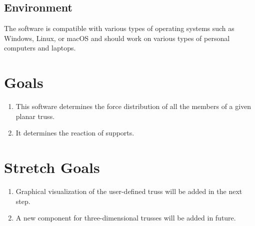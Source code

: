 \documentclass{article}
\begin{document}
\subsection{Environment}
The software is compatible with various types of operating
systems such as Windows, Linux, or macOS and should work on various types of personal computers and laptops.


\section{Goals}
\begin{enumerate}
    \item This software determines the force  distribution of all the members of a given planar truss.
    \item It determines the reaction of supports.
    
\end{enumerate}

\section{Stretch Goals}
\begin{enumerate}
    
    \item Graphical visualization of the user-defined truss will be added in the next step.
    \item A new component for three-dimensional trusses will be added in future.
    
\end{enumerate}
\end{document}
